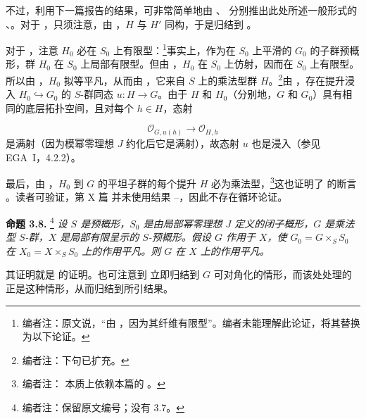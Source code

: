 不过，利用下一篇报告的结果，可非常简单地由 、 分别推出此处所述一般形式的 、。对于 ，只须注意，由 ，\(H\) 与 \(H'\) 同构，于是归结到 。

对于 ，注意 \(H_0\) 必在 \(S_0\) 上有限型：\footnote{编者注：原文说，“由 ，因为其纤维有限型”。编者未能理解此论证，将其替换为以下论证。}事实上，作为在 \(S_0\) 上平滑的 \(G_0\) 的子群预概形，群 \(H_0\) 在 \(S_0\) 上局部有限型。但由 ，\(H_0\) 在 \(S_0\) 上仿射，因而在 \(S_0\) 上有限型。所以由 ，\(H_0\) 拟等平凡，从而由 ，它来自 \(S\) 上的乘法型群 \(H\)。\footnote{编者注：下句已扩充。}由 ，存在提升浸入 \(H_0\hookrightarrow
G_0\) 的 \(S\)-群同态 \(u:H\to G\)。由于 \(H\) 和 \(H_0\)（分别地，\(G\) 和 \(G_0\)）具有相同的底层拓扑空间，且对每个 \(h\in H\)，态射

\[
  \mathscr O_{G,u(h)}\longrightarrow\mathscr O_{H,h}
\]
是满射（因为模幂零理想 \(J\) 约化后它是满射），故态射 \(u\) 也是浸入（参见 EGA~I，4.2.2）。

最后，由 ，\(H_0\) 到 \(G\) 的平坦子群的每个提升 \(H\) 必为乘法型，\footnote{编者注： 本质上依赖本篇的 。}这也证明了  的断言 。读者可验证，第 X 篇 并未使用结果 --，因此不存在循环论证。

\medskip
\noindent{}\textbf{命题 3.8.}
\footnote{编者注：保留原文编号；没有 3.7。}
\textit{设 \(S\) 是预概形，\(S_0\) 是由局部幂零理想 \(J\) 定义的闭子概形，\(G\) 是乘法型 \(S\)-群，\(X\) 是局部有限呈示的 \(S\)-预概形。假设 \(G\) 作用于 \(X\)，使 \(G_0=G\times_SS_0\) 在 \(X_0=X\times_SS_0\) 上的作用平凡。则 \(G\) 在 \(X\) 上的作用平凡。}

其证明就是  的证明。也可注意到  立即归结到 \(G\) 可对角化的情形，而该处处理的正是这种情形，从而归结到所引结果。

